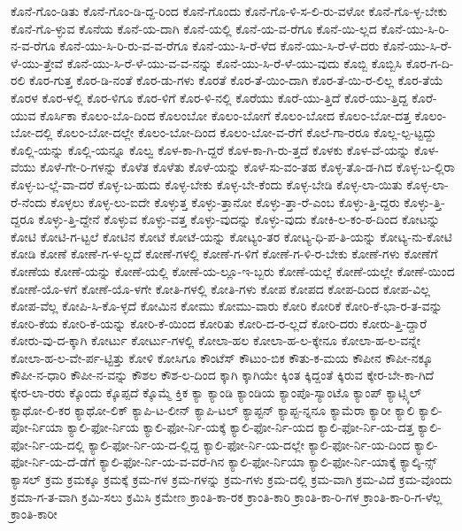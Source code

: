 {ಕೊನೆ-ಗೊಂ-ಡಿತು
ಕೊನೆ-ಗೊಂ-ಡಿ-ದ್ದ-ರಿಂದ
ಕೊನೆ-ಗೊಂದು
ಕೊನೆ-ಗೊ-ಳಿ-ಸ-ಲಿ-ರು-ವಳೋ
ಕೊನೆ-ಗೊ-ಳ್ಳ-ಬೇಕು
ಕೊನೆ-ಗೊ-ಳ್ಳುವ
ಕೊನೆಯ
ಕೊನೆ-ಯ-ದಾಗಿ
ಕೊನೆ-ಯಲ್ಲಿ
ಕೊನೆ-ಯ-ವ-ರೆಗೂ
ಕೊನೆ-ಯಿ-ಲ್ಲದ
ಕೊನೆ-ಯು-ಸಿ-ರಿ-ನ-ವ-ರೆಗೂ
ಕೊನೆ-ಯು-ಸಿ-ರಿ-ರು-ವ-ವ-ರೆಗೂ
ಕೊನೆ-ಯು-ಸಿ-ರೆ-ಳೆದ
ಕೊನೆ-ಯು-ಸಿ-ರೆ-ಳೆ-ದರು
ಕೊನೆ-ಯು-ಸಿ-ರೆ-ಳೆ-ಯು-ತ್ತೇವೆ
ಕೊನೆ-ಯು-ಸಿ-ರೆ-ಳೆ-ಯು-ವ-ವ-ನನ್ನು
ಕೊನೆ-ಯು-ಸಿ-ರೆ-ಳೆ-ಯು-ವುದು
ಕೊಬ್ಬಿ
ಕೊಬ್ಬಿಸಿ
ಕೊರ-ಗ-ದಿ-ರಲಿ
ಕೊರ-ಗುತ್ತ
ಕೊರ-ಡಿ-ನಂತೆ
ಕೊರ-ಡು-ಗಳು
ಕೊರತೆ
ಕೊರ-ತೆ-ಯಿಂ-ದಾಗಿ
ಕೊರ-ತೆ-ಯಿ-ರ-ಲಿಲ್ಲ
ಕೊರ-ತೆಯೆ
ಕೊರಳ
ಕೊರ-ಳಲ್ಲಿ
ಕೊರ-ಳಿಗೂ
ಕೊರ-ಳಿಗೆ
ಕೊರ-ಳಿ-ನಲ್ಲಿ
ಕೊರೆಯು
ಕೊರೆ-ಯು-ತ್ತಿದೆ
ಕೊರೆ-ಯು-ತ್ತಿದ್ದ
ಕೊರೆ-ಯುವ
ಕೊರ್ಸಿಕಾ
ಕೊಲಂ-ಬೊ-ದಿಂದ
ಕೊಲಂಬೋ
ಕೊಲಂ-ಬೋಗೆ
ಕೊಲಂ-ಬೋದ
ಕೊಲಂ-ಬೋ-ದತ್ತ
ಕೊಲಂ-ಬೋ-ದಲ್ಲಿ
ಕೊಲಂ-ಬೋ-ದಲ್ಲೇ
ಕೊಲಂ-ಬೋ-ದಿಂದ
ಕೊಲಂ-ಬೋ-ವ-ರೆಗೆ
ಕೊಲೆ-ಗಾ-ರರೂ
ಕೊಲ್ಲ-ಲ್ಪ-ಟ್ಟದ್ದು
ಕೊಲ್ಲಿ-ಯನ್ನು
ಕೊಲ್ಲಿ-ಯನ್ನೂ
ಕೊಲ್ವ
ಕೊಳ-ಕಾ-ಗಿ-ದ್ದರೆ
ಕೊಳ-ಕಾ-ಗಿ-ರು-ತ್ತದೆ
ಕೊಳಕು
ಕೊಳ-ವೆ-ಯನ್ನು
ಕೊಳ-ವೆಯು
ಕೊಳೆ-ಗೇ-ರಿ-ಗಳನ್ನು
ಕೊಳೆತ
ಕೊಳೆತು
ಕೊಳೆ-ಯನ್ನು
ಕೊಳೆ-ಸು-ವಂ-ತಹ
ಕೊಳ್ಳ-ತೊ-ಡ-ಗಿದ
ಕೊಳ್ಳ-ಬ-ಲ್ಲಿರಾ
ಕೊಳ್ಳ-ಬ-ಲ್ಲೆ-ವಾ-ದರೆ
ಕೊಳ್ಳ-ಬ-ಹುದು
ಕೊಳ್ಳ-ಬೇಕು
ಕೊಳ್ಳ-ಬೇ-ಕೆಂದು
ಕೊಳ್ಳ-ಬೇಡಿ
ಕೊಳ್ಳ-ಲಾ-ಯಿತು
ಕೊಳ್ಳ-ಲಾ-ರೆ-ನೆಂದು
ಕೊಳ್ಳಲು
ಕೊಳ್ಳ-ಲು-ಐದೇ
ಕೊಳ್ಳುತ್ತ
ಕೊಳ್ಳು-ತ್ತಾನೋ
ಕೊಳ್ಳು-ತ್ತಾ-ರೆ-ಎಂಬ
ಕೊಳ್ಳು-ತ್ತಿ-ದ್ದರು
ಕೊಳ್ಳು-ತ್ತಿ-ದ್ದರೂ
ಕೊಳ್ಳು-ತ್ತಿ-ದ್ದೇನೆ
ಕೊಳ್ಳುವ
ಕೊಳ್ಳು-ವತ್ತ
ಕೊಳ್ಳು-ವುದನ್ನು
ಕೊಳ್ಳು-ವುದು
ಕೋಕಿ-ಲ-ಕಂ-ಠ-ದಿಂದ
ಕೋಟನ್ನು
ಕೋಟಿ
ಕೋಟಿ-ಗ-ಟ್ಟಲೆ
ಕೋಟಿನ
ಕೋಟೆ
ಕೋಟೆ-ಯನ್ನು
ಕೋಟ್ಯಂ-ತರ
ಕೋಟ್ಯ-ಧಿ-ಪ-ತಿ-ಯನ್ನು
ಕೋಟ್ಯ-ನು-ಕೋಟಿ
ಕೋಡಿ
ಕೋಣೆ
ಕೋಣೆ-ಗ-ಳ-ಲ್ಲದೆ
ಕೋಣೆ-ಗಳಲ್ಲಿ
ಕೋಣೆ-ಗ-ಳಿಗೆ
ಕೋಣೆ-ಗ-ಳಿ-ರ-ಬೇಕು
ಕೋಣೆ-ಗಳು
ಕೋಣೆಗೆ
ಕೋಣೆಯ
ಕೋಣೆ-ಯನ್ನು
ಕೋಣೆ-ಯಲ್ಲಿ
ಕೋಣೆ-ಯ-ಲ್ಲೂ-ಇ-ಬ್ಬರು
ಕೋಣೆ-ಯಲ್ಲೆ
ಕೋಣೆ-ಯಲ್ಲೇ
ಕೋಣೆ-ಯಿಂದ
ಕೋಣೆ-ಯೊ-ಳಗೆ
ಕೋಣೆ-ಯೊ-ಳಗೇ
ಕೋತಿ-ಗಳಲ್ಲಿ
ಕೋತಿ-ಗಳು
ಕೋಪ
ಕೋಪದ
ಕೋಪ-ದಿಂದ
ಕೋಪ-ವಿಲ್ಲ
ಕೋಪ-ವೆಲ್ಲ
ಕೋಪಿ-ಸಿ-ಕೊ-ಳ್ಳದೆ
ಕೋಮಿನ
ಕೋಮು
ಕೋಮು-ವಾರು
ಕೋರಿ
ಕೋರಿಕೆ
ಕೋರಿ-ಕೆ-ಭಾ-ರ-ತ-ವನ್ನು
ಕೋರಿ-ಕೆಯ
ಕೋರಿ-ಕೆ-ಯನ್ನು
ಕೋರಿ-ಕೆ-ಯಿಂದ
ಕೋರಿತು
ಕೋರಿ-ದ-ರ-ಲ್ಲದೆ
ಕೋರಿ-ದರು
ಕೋರು-ತ್ತಿ-ದ್ದಾರೆ
ಕೋರು-ವು-ದ-ಕ್ಕಾಗಿ
ಕೋರ್ಟು
ಕೋರ್ಟು-ಗಳಲ್ಲಿ
ಕೋಲಾ-ಹಲ
ಕೋಲಾ-ಹ-ಲ-ಕ್ಕೇನೂ
ಕೋಲಾ-ಹ-ಲ-ವನ್ನೇ
ಕೋಲಾ-ಹ-ಲ-ವೇ-ರ್ಪ-ಟ್ಟಿತ್ತು
ಕೋಳಿ
ಕೋಸಿಗೂ
ಕೌಂಟೆಸ್
ಕೌಟುಂ-ಬಿಕ
ಕೌತು-ಕ-ಮಯ
ಕೌಪೀನ
ಕೌಪೀ-ನಕ್ಕೂ
ಕೌಪೀ-ನ-ಧಾರಿ
ಕೌಪೀ-ನ-ವನ್ನು
ಕೌಶಲ
ಕೌಶ-ಲ-ದಿಂದ
ಕ್ಕಾಗಿ
ಕ್ಕಾಗಿಯೇ
ಕ್ಕಿಂತ
ಕ್ಕಿದ್ದಂತೆ
ಕ್ಕಿರುವ
ಕ್ಕೇರ-ಬೇ-ಕಾ-ಗಿದೆ
ಕ್ಕೇರ-ಲಾ-ರರು
ಕ್ಕೊಂದು
ಕ್ಕೊಪ್ಪದೆ
ಕ್ಕೊಮ್ಮೆ
ಕ್ತಿಕ
ಕ್ಯಾ
ಕ್ಯಾಂಡಿ
ಕ್ಯಾಂಡಿಯ
ಕ್ಯಾಂಪೊ-ಸ್ಯಾಂಟೊ
ಕ್ಯಾಂಪ್
ಕ್ಯಾಟ್ಸ್ಕಿಲ್
ಕ್ಯಾಥೋ-ಲಿ-ಕರ
ಕ್ಯಾಥೋ-ಲಿಕ್
ಕ್ಯಾಪಿ-ಟ-ಲೀನ್
ಕ್ಯಾಪಿ-ಟಲ್
ಕ್ಯಾಪ್ಟನ್
ಕ್ಯಾಪ್ಟ-ನ್ನನೂ
ಕ್ಯಾಮೆರಾ
ಕ್ಯಾರೀ
ಕ್ಯಾಲಿ
ಕ್ಯಾಲಿ-ಪೋ-ರ್ನಿಯಾ
ಕ್ಯಾಲಿ-ಫೋ-ರ್ನಿಯ
ಕ್ಯಾಲಿ-ಫೋ-ರ್ನಿ-ಯಕ್ಕೆ
ಕ್ಯಾಲಿ-ಫೋ-ರ್ನಿ-ಯದ
ಕ್ಯಾಲಿ-ಫೋ-ರ್ನಿ-ಯ-ದತ್ತ
ಕ್ಯಾಲಿ-ಫೋ-ರ್ನಿ-ಯ-ದಲ್ಲಿ
ಕ್ಯಾಲಿ-ಫೋ-ರ್ನಿ-ಯ-ದ-ಲ್ಲಿದ್ದ
ಕ್ಯಾಲಿ-ಫೋ-ರ್ನಿ-ಯ-ದಲ್ಲೇ
ಕ್ಯಾಲಿ-ಫೋ-ರ್ನಿ-ಯ-ದಿಂದ
ಕ್ಯಾಲಿ-ಫೋ-ರ್ನಿ-ಯ-ದೆ-ಡೆಗೆ
ಕ್ಯಾಲಿ-ಫೋ-ರ್ನಿ-ಯ-ವ-ವರೆ-ಗಿನ
ಕ್ಯಾಲಿ-ಫೋ-ರ್ನಿಯಾ
ಕ್ಯಾಲಿ-ಫೋ-ರ್ನಿ-ಯಾಕ್ಕೆ
ಕ್ಯಾಲ್ಕಿ-ನ್ಸ್
ಕ್ಯಾಸಲ್
ಕ್ರಮ
ಕ್ರಮಕ್ಕೂ
ಕ್ರಮಕ್ಕೆ
ಕ್ರಮ-ಗಳ
ಕ್ರಮ-ಗಳನ್ನು
ಕ್ರಮ-ಗಳು
ಕ್ರಮ-ದಲ್ಲಿ
ಕ್ರಮ-ವಾಗಿ
ಕ್ರಮ-ವಿದೆ
ಕ್ರಮ-ವೊಂದು
ಕ್ರಮಾ-ಗ-ತ-ವಾಗಿ
ಕ್ರಮಿ-ಸಲು
ಕ್ರಮಿಸಿ
ಕ್ರಮೇಣ
ಕ್ರಾಂತಿ-ಕಾ-ರಕ
ಕ್ರಾಂತಿ-ಕಾರಿ
ಕ್ರಾಂತಿ-ಕಾ-ರಿ-ಗಳ
ಕ್ರಾಂತಿ-ಕಾ-ರಿ-ಗ-ಳೆಲ್ಲ
ಕ್ರಾಂತಿ-ಕಾರೀ
}
